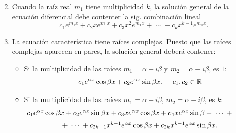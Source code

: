 \documentclass{beamer}
\begin{document}
\begin{frame}[t]
	\begin{block}{}
		\begin{enumerate}
		\setcounter{enumi}{1}
		\item Cuando la raíz real \(m_1\) tiene multiplicidad \(k\), la solución general de la ecuación diferencial debe contenter la sig. combinación lineal
			\[
				c_1e^{m_1x} + c_2xe^{m_1x} +c_3x^2e^{m_1x} + \;\cdots\; + c_{k} x^{k-1} e^{m_1x}.
			\]
		\item La ecuación característica tiene raíces complejas. Puesto que las raíces complejas aparecen en pares, la solución general deberá contener:
			\begin{itemize}
				\setlength{\itemindent}{-1em}
				\item Si la multiplicidad de las raíces \(m_1= \alpha +i \beta\) y \(m_2= \alpha -i \beta\), es \(1\):
					\[
						c_1e^{\alpha x} \cos \beta x+ c_2 e^{\alpha x} \sin \beta x. \hspace{5mm} c_1,c_2 \in \mathbb{R}
					\]
				\item Si la multiplicidad de las raíces \(m_1= \alpha +i \beta\), \(m_2 = \alpha - i \beta\), es \(k\):
					\[
						\begin{array}{c}
							\hspace{-1cm} c_1e^{\alpha x} \cos \beta x + c_2e^{\alpha x} \sin \beta x + c_3xe^{\alpha x} \cos \beta x + c_4xe^{\alpha x} \sin \beta + \;\cdots\; + \\[2mm]
							+ \;\cdots\; + c_{2k-1} x^{k-1} e^{\alpha x} \cos \beta x+c_{2k} x^{k-1} e^{\alpha x} \sin \beta x.
						\end{array}
					\]
			\end{itemize}
		\end{enumerate}
	\end{block}
\end{frame}
\end{document}
